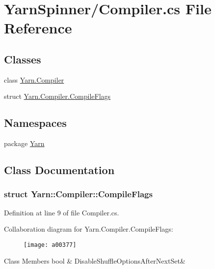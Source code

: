 \hypertarget{a00295}{\section{Yarn\-Spinner/\-Compiler.cs File Reference}
\label{a00295}
}
\subsection*{Classes}
\begin{DoxyCompactItemize}
\item 
class \hyperlink{a00048}{Yarn.\-Compiler}
\item 
struct \hyperlink{a00048_a00363}{Yarn.\-Compiler.\-Compile\-Flags}
\end{DoxyCompactItemize}
\subsection*{Namespaces}
\begin{DoxyCompactItemize}
\item 
package \hyperlink{a00045}{Yarn}
\end{DoxyCompactItemize}


\subsection{Class Documentation}
\label{a00363}
\hypertarget{a00048_a00363}{}
\subsubsection{struct Yarn\-:\-:Compiler\-:\-:Compile\-Flags}


Definition at line 9 of file Compiler.\-cs.



Collaboration diagram for Yarn.\-Compiler.\-Compile\-Flags\-:
\nopagebreak
\begin{figure}[H]
\begin{center}
\leavevmode
\texttt{[image: a00377]}
\end{center}
\end{figure}
\begin{DoxyFields}{Class Members}
\hypertarget{a00048_a8b49bb7763ff477cba21d7c771ef3ed0}{bool}\label{a00048_a8b49bb7763ff477cba21d7c771ef3ed0}
&
Disable\-Shuffle\-Options\-After\-Next\-Set&
\\
\hline

\end{DoxyFields}
